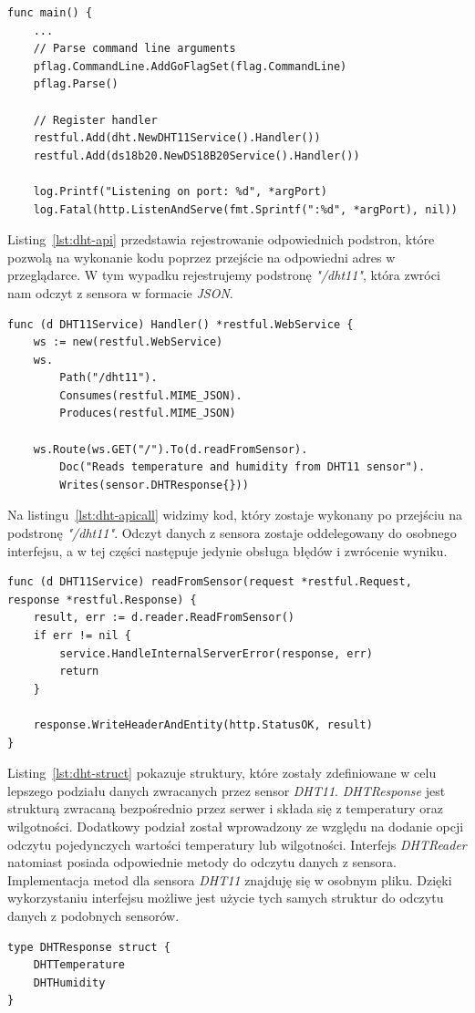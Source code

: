 \documentclass[12pt]{report}
\begin{document}
{\begin{lstlisting}[language=golang,caption=Konfiguracja aplikacji,label=lst:dht-config]
func main() {
	...
	// Parse command line arguments
	pflag.CommandLine.AddGoFlagSet(flag.CommandLine)
	pflag.Parse()

	// Register handler
	restful.Add(dht.NewDHT11Service().Handler())
	restful.Add(ds18b20.NewDS18B20Service().Handler())

	log.Printf("Listening on port: %d", *argPort)
	log.Fatal(http.ListenAndServe(fmt.Sprintf(":%d", *argPort), nil))
\end{lstlisting}

\noindent Listing~\ref{lst:dht-api} przedstawia rejestrowanie odpowiednich podstron, które pozwolą na wykonanie kodu poprzez przejście na odpowiedni adres w przeglądarce. W tym wypadku rejestrujemy podstronę \textit{"/dht11"}, która zwróci nam odczyt z sensora w formacie \textit{JSON}.
\clearpage
\begin{lstlisting}[language=golang,caption=Konfiguracja API,label=lst:dht-api]
func (d DHT11Service) Handler() *restful.WebService {
	ws := new(restful.WebService)
	ws.
		Path("/dht11").
		Consumes(restful.MIME_JSON).
		Produces(restful.MIME_JSON)

	ws.Route(ws.GET("/").To(d.readFromSensor).
		Doc("Reads temperature and humidity from DHT11 sensor").
		Writes(sensor.DHTResponse{}))
\end{lstlisting}

\noindent Na listingu~\ref{lst:dht-apicall} widzimy kod, który zostaje wykonany po przejściu na podstronę \textit{"/dht11"}. Odczyt danych z sensora zostaje oddelegowany do osobnego interfejsu, a w tej części następuje jedynie obsługa błędów i zwrócenie wyniku.
\begin{lstlisting}[language=golang,caption=Wywołanie kodu API,label=lst:dht-apicall]
func (d DHT11Service) readFromSensor(request *restful.Request, response *restful.Response) {
	result, err := d.reader.ReadFromSensor()
	if err != nil {
		service.HandleInternalServerError(response, err)
		return
	}

	response.WriteHeaderAndEntity(http.StatusOK, result)
}
\end{lstlisting}

\noindent Listing~\ref{lst:dht-struct} pokazuje struktury, które zostały zdefiniowane w celu lepszego podziału danych zwracanych przez sensor \textit{DHT11}. \textit{DHTResponse} jest strukturą zwracaną bezpośrednio przez serwer i składa się z temperatury oraz wilgotności. Dodatkowy podział został wprowadzony ze względu na dodanie opcji odczytu pojedynczych wartości temperatury lub wilgotności. Interfejs \textit{DHTReader} natomiast posiada odpowiednie metody do odczytu danych z sensora. Implementacja metod dla sensora \textit{DHT11} znajduję się w osobnym pliku. Dzięki wykorzystaniu interfejsu możliwe jest użycie tych samych struktur do odczytu danych z podobnych sensorów.
\begin{lstlisting}[language=golang,caption=Struktury odpowiedzi serwera,label=lst:dht-struct]
type DHTResponse struct {
	DHTTemperature
	DHTHumidity
}


\end{lstlisting}}
\end{document}
